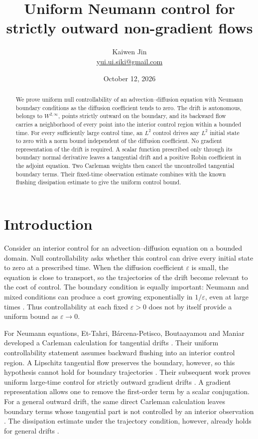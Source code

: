 \documentclass[11pt]{article}
\title{Uniform Neumann control for strictly outward non-gradient flows}
\author{Kaiwen Jin\\\small\href{mailto:yui.ui.siki@gmail.com}{yui.ui.siki@gmail.com}}
\date{October 12, 2026}
\theoremstyle{remark}
\newcommand{\eps}{\varepsilon}
\begin{document}
\maketitle
\begin{abstract}
We prove uniform null controllability of an advection--diffusion equation with
Neumann boundary conditions as the diffusion coefficient tends to zero. The
drift is autonomous, belongs to $W^{2,\infty}$, points strictly outward on the
boundary, and its backward flow carries a neighborhood of every point into
the interior control region within a bounded time. For every sufficiently
large control time, an $L^2$ control drives any $L^2$ initial state to zero
with a norm bound independent of the diffusion coefficient. No gradient
representation of the drift is required. A scalar function prescribed only
through its boundary normal derivative leaves a tangential drift and a
positive Robin coefficient in the adjoint equation. Two Carleman weights
then cancel the uncontrolled tangential boundary terms. Their fixed-time
observation estimate combines with the known flushing dissipation estimate
to give the uniform control bound.
\end{abstract}

\section{Introduction}

Consider an interior control for an advection--diffusion equation on a bounded
domain. Null controllability asks whether this control can drive every initial
state to zero at a prescribed time. When the diffusion coefficient $\eps$ is
small, the equation is close to transport, so the trajectories of the drift
become relevant to the cost of control. The boundary condition is equally
important: Neumann and mixed conditions can produce a cost growing
exponentially in $1/\eps$, even at large times
\cite[Theorems 2.8 and 2.9]{Barcena}. Thus controllability at each fixed $\eps>0$ does
not by itself provide a uniform bound as $\eps\to0$.

For Neumann equations, Et-Tahri, B\'arcena-Petisco, Boutaayamou and Maniar
developed a Carleman calculation for tangential drifts
\cite[Section 6]{Tangential}. Their uniform controllability statement
\cite[Theorem 1.4]{Tangential} assumes backward flushing into an interior
control region. A Lipschitz tangential flow preserves the boundary, however,
so this hypothesis cannot hold for boundary trajectories
\cite[Remark 1.6]{Outward}. Their subsequent work proves uniform large-time
control for strictly outward gradient drifts \cite[Theorem 1.5]{Outward}.
A gradient representation allows
one to remove the first-order term by a scalar conjugation. For a general
outward drift, the same direct Carleman calculation leaves boundary terms
whose tangential part is not controlled by an interior observation
\cite[Remark 1.6]{Outward}. The dissipation estimate under the trajectory
condition, however, already holds for general drifts
\cite[Proposition 4.7(1)]{Outward}.
\end{document}
